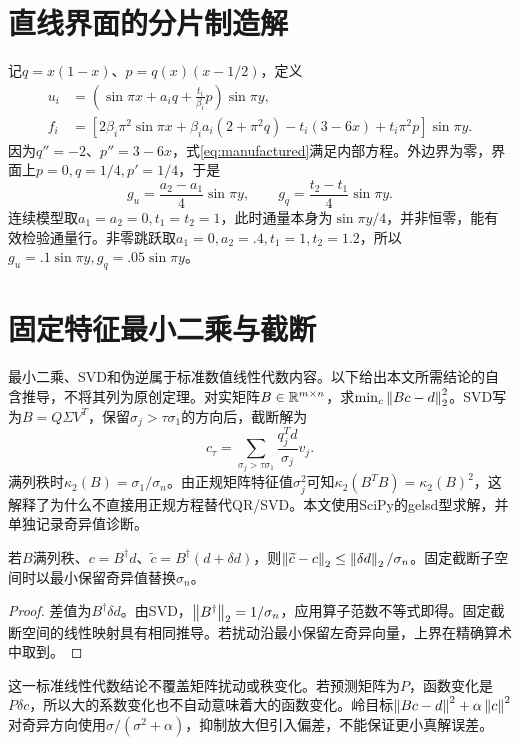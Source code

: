 \section{直线界面的分片制造解}
记$q=x(1-x)$、$p=q(x)(x-1/2)$，定义
\begin{align}
u_i&=\left(\sin\pi x+a_iq+\frac{t_i}{\beta_i}p\right)\sin\pi y,\label{eq:manufactured}\\
f_i&=\left[2\beta_i\pi^2\sin\pi x+\beta_i a_i(2+\pi^2q)-t_i(3-6x)+t_i\pi^2p\right]\sin\pi y.
\end{align}
因为$q''=-2$、$p''=3-6x$，式\eqref{eq:manufactured}满足内部方程。外边界为零，界面上$p=0,q=1/4,p'=1/4$，于是
\begin{equation}
g_u=\frac{a_2-a_1}{4}\sin\pi y,\qquad g_q=\frac{t_2-t_1}{4}\sin\pi y.
\end{equation}
连续模型取$a_1=a_2=0,t_1=t_2=1$，此时通量本身为$\sin\pi y/4$，并非恒零，能有效检验通量行。非零跳跃取$a_1=0,a_2=.4,t_1=1,t_2=1.2$，所以$g_u=.1\sin\pi y,g_q=.05\sin\pi y$。

\section{固定特征最小二乘与截断}
最小二乘、SVD和伪逆属于标准数值线性代数内容\cite{golub}。以下给出本文所需结论的自含推导，不将其列为原创定理。对实矩阵$B\in\mathbb R^{m\times n}$，求$\min_c\left\lVert Bc-d\right\rVert_2^2$。SVD写为$B=Q\Sigma V^T$，保留$\sigma_j>\tau\sigma_1$的方向后，截断解为
\begin{equation}\label{eq:tsvd}
c_\tau=\sum_{\sigma_j>\tau\sigma_1}\frac{q_j^Td}{\sigma_j}v_j.
\end{equation}
满列秩时$\kappa_2(B)=\sigma_1/\sigma_n$。由正规矩阵特征值$\sigma_j^2$可知$\kappa_2(B^TB)=\kappa_2(B)^2$，这解释了为什么不直接用正规方程替代QR/SVD。本文使用SciPy的gelsd型求解，并单独记录奇异值诊断\cite{scipy}。

\begin{proposition}[固定矩阵右端扰动]
若$B$满列秩、$c=B^\dagger d$、$\widetilde c=B^\dagger(d+\delta d)$，则$\left\lVert\widetilde c-c\right\rVert_2\le\left\lVert\delta d\right\rVert_2/\sigma_n$。固定截断子空间时以最小保留奇异值替换$\sigma_n$。
\end{proposition}
\begin{proof}
差值为$B^\dagger\delta d$。由SVD，$\left\lVert B^\dagger\right\rVert_2=1/\sigma_n$，应用算子范数不等式即得。固定截断空间的线性映射具有相同推导。若扰动沿最小保留左奇异向量，上界在精确算术中取到。
\end{proof}
这一标准线性代数结论不覆盖矩阵扰动或秩变化。若预测矩阵为$P$，函数变化是$P\delta c$，所以大的系数变化也不自动意味着大的函数变化。岭目标$\left\lVert Bc-d\right\rVert^2+\alpha\left\lVert c\right\rVert^2$对奇异方向使用$\sigma/(\sigma^2+\alpha)$，抑制放大但引入偏差，不能保证更小真解误差。
